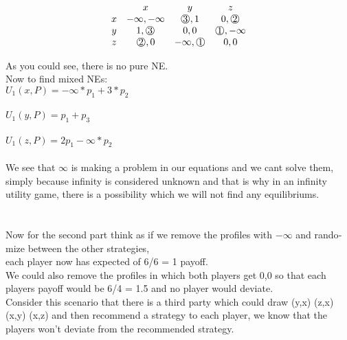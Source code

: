 \begin{latin}
  \begin{center}

    \begin{equation*}
      \begin{matrix}
          & x               & y                 & z                 \\
        x & -\infty,-\infty & \circs{3},1       & 0,\circs{2}       \\
        y & 1,\circs{3}     & 0,0               & \circs{1},-\infty \\
        z & \circs{2},0     & -\infty,\circs{1} & 0,0
      \end{matrix}
    \end{equation*}
  \end{center}
  As you could see, there is no pure NE.
  \\
  Now to find mixed NEs: \\
  $U_1(x,P) = -\infty * p_1 + 3 * p_2$\\\\
  $U_1(y,P) = p_1 + p_3$\\\\
  $U_1(z,P) = 2p_1 -\infty * p_2$\\\\
  We see that $\infty$ is making a problem in our equations and we cant solve them, simply because infinity is considered unknown and that is why in an infinity utility game, there is a possibility which we will not find any equilibriums.\\
  \\\\
  Now for the second part think as if we remove the profiles with $-\infty$ and randomize between the other strategies, \\
  each player now has expected of 6/6 = 1 payoff. \\
  We could also remove the profiles in which both players get 0,0 so that each players payoff would be 6/4 = 1.5 and no player would deviate.\\
  Consider this scenario that there is a third party which could draw (y,x) (z,x) (x,y) (x,z) and then recommend a strategy to each player, we know that the players won't deviate from the recommended strategy.\\
\end{latin}
